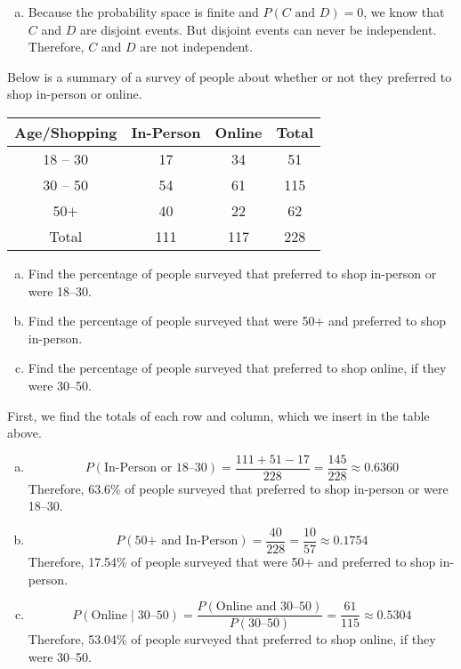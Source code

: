 \documentclass[12pt,letterpaper]{exam}
\begin{document}
\begin{questions}
\begin{enumerate}[(a)]
\item Because the probability space is finite and $P(C \text{ and } D)= 0$, we know that $C$ and $D$ are disjoint events. But disjoint events can never be independent. Therefore, $C$ and $D$ are not independent. 
\end{enumerate}



\newpage
\question[10] Below is a summary of a survey of people about whether or not they preferred to shop in-person or online. \par
	\begin{table}[h]
	\centering
	\begin{tabular}{c|cc||c}
	Age/Shopping & In-Person & Online & Total \\ \hline
	18 -- 30 & 17 & 34 & 51 \\
	30 -- 50 & 54 & 61 & 115 \\
	50$+$ & 40 & 22 & 62 \\ \hline \hline
	Total & 111 & 117 & 228
	\end{tabular}
	\end{table} \par

\begin{enumerate}[(a)]
\item Find the percentage of people surveyed that preferred to shop in-person or were 18--30. 
\item Find the percentage of people surveyed that were 50$+$ and preferred to shop in-person. 
\item Find the percentage of people surveyed that preferred to shop online, if they were 30--50. 
\end{enumerate} \pspace

\sol First, we find the totals of each row and column, which we insert in the table above. 
\begin{enumerate}[(a)]
\item 
	\[
	P(\text{In-Person or 18--30})= \dfrac{111 + 51 - 17}{228}= \dfrac{145}{228} \approx 0.6360
	\] 
Therefore, 63.6\% of people surveyed that preferred to shop in-person or were 18--30. \pspace

\item 
	\[
	P(\text{50+ and In-Person})= \dfrac{40}{228}= \dfrac{10}{57} \approx 0.1754
	\]
Therefore, 17.54\% of people surveyed that were 50$+$ and preferred to shop in-person. \pspace

\item 
	\[
	P(\text{Online} \;|\; \text{30--50})= \dfrac{P(\text{Online and 30--50})}{P(\text{30--50})}= \dfrac{61}{115} \approx 0.5304
	\]
Therefore, 53.04\% of people surveyed that preferred to shop online, if they were 30--50. 
\end{enumerate} 




\end{questions}
\end{document}

